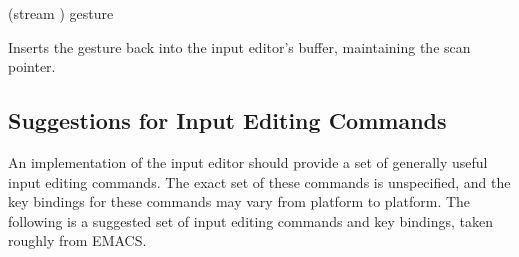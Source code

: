  {(stream ) gesture}

Inserts the gesture  back into the input editor's buffer,
maintaining the scan pointer.


\subsection {Suggestions for Input Editing Commands}

An implementation of the input editor should provide a set of generally useful
input editing commands.  The exact set of these commands is unspecified, and the
key bindings for these commands may vary from platform to platform.  The
following is a suggested set of input editing commands and key bindings, taken
roughly from EMACS.


